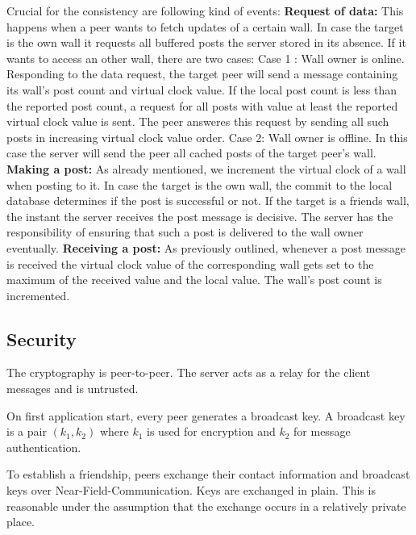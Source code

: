 \documentclass{report}
\begin{document}
Crucial for the consistency are following kind of events:\newline
\textbf{Request of data:} This happens when a peer wants to fetch updates of a certain wall.  
In case the target is the own wall it requests all buffered posts the server stored in its absence.
If it wants to access an other wall, there are two cases:\newline
Case 1 : Wall owner is online.
Responding to the data request, the target peer will send a message containing its wall's post count and virtual clock value. If the local post count is less than the reported post count, a request for all posts with value at least the reported virtual clock value is sent. The peer answeres this request by sending all such posts in increasing virtual clock value order. \newline
Case 2: Wall owner is offline.
In this case the server will send the peer all cached posts of the target peer's wall.\newline
\textbf{Making a post:}
As already mentioned, we increment the virtual clock of a wall when posting to it.\newline
In case the target is the own wall, the commit to the local database determines if the post is successful or not.
If the target is a friends wall, the instant the server receives the post message is decisive. The server has the responsibility of ensuring that such a post is delivered to the wall owner eventually. \newline
\textbf{Receiving a post:}
As previously outlined, whenever a post message is received the virtual clock value of the corresponding wall gets set to the maximum of the received value and the local value.  The wall's post count is incremented.

\subsection{Security}
The cryptography is peer-to-peer. The server acts as a relay for the client messages and is untrusted.

On first application start, every peer generates a broadcast key. A broadcast key is a pair $(k_1, k_2)$ where $k_1$ is used for encryption and $k_2$ for message authentication.

To establish a friendship, peers exchange their contact information and broadcast keys over Near-Field-Communication. Keys are exchanged in plain. This is reasonable under the assumption that the exchange occurs in a relatively private place.
\end{document}
